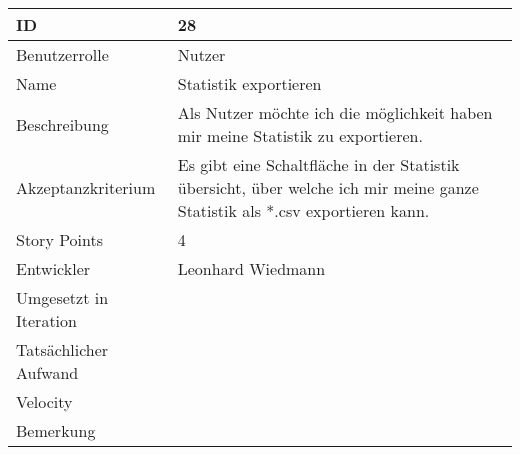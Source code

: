 \begin{tabularx}{\textwidth}{|p{}|X|}
	\hline
	ID & 28 \\
	\hline
	Benutzerrolle & Nutzer \\
	\hline
	Name & Statistik exportieren\\
	\hline
	Beschreibung & Als Nutzer möchte ich die möglichkeit haben mir meine Statistik zu exportieren. \\
	\hline
	Akzeptanzkriterium & Es gibt eine Schaltfläche in der Statistik übersicht, über welche ich mir meine ganze Statistik als *.csv exportieren kann. \\
	\hline
	Story Points & 4 \\
	\hline
	Entwickler & Leonhard Wiedmann \\
	\hline
	Umgesetzt in Iteration & \\
	\hline
	Tatsächlicher Aufwand & \\
	\hline
	Velocity & \\
	\hline
	Bemerkung & \\
	\hline
\end{tabularx}
\vspace{20pt}
